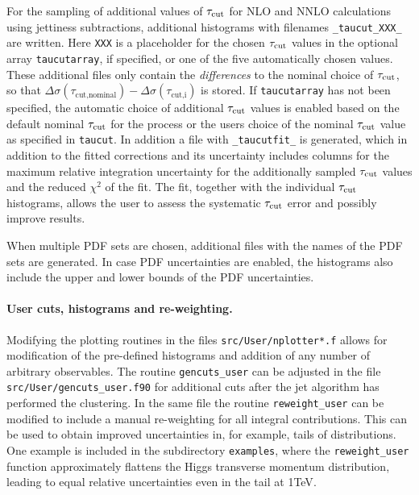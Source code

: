 For the sampling of additional values of $\tau_{\text{cut}}$ for NLO and NNLO calculations using jettiness subtractions, 
additional histograms with filenames \texttt{\_taucut\_XXX\_} are written. Here \texttt{XXX} is a placeholder for the 
chosen $\tau_{\text{cut}}$ values in the optional array \texttt{taucutarray}, if specified, or one of the five automatically 
chosen values. These additional files 
only contain the \emph{differences} to the nominal choice of 
$\tau_{\text{cut}}$, so that $\Delta\sigma(\tau_{\text{cut,nominal}}) - \Delta\sigma(\tau_{\text{cut,i}})$ is stored. If 
\texttt{taucutarray} has not 
been specified, the automatic choice of additional
$\tau_{\text{cut}}$ values is enabled based on the default nominal $\tau_{\text{cut}}$ for the process or the users choice of the nominal 
$\tau_{\text{cut}}$ value as specified in \texttt{taucut}.
In addition a file with \texttt{\_taucutfit\_} is generated, which in addition to the fitted corrections and its 
uncertainty includes columns for the maximum relative integration uncertainty for the additionally sampled $\tau_{\text{cut}}$ 
values and the 
reduced $\chi^2$ of the fit. %
The fit, together with the individual $\tau_{\text{cut}}$ 
histograms, allows the user to assess the systematic $\tau_{\text{cut}}$ error and possibly improve results.

When multiple PDF sets are chosen, additional files with the names of the PDF sets are generated. In case
PDF uncertainties are enabled, the histograms also include the upper and lower bounds of the PDF uncertainties.

\paragraph{User cuts, histograms and re-weighting.}

Modifying the plotting routines in the files \texttt{src/User/nplotter*.f} allows for modification of the pre-defined 
histograms and addition of any number of arbitrary observables. The routine \texttt{gencuts\_user} can be adjusted  in 
the file
\texttt{src/User/gencuts\_user.f90} for additional cuts after the jet algorithm has performed the 
clustering. In the same file the routine \texttt{reweight\_user} can be modified to include a manual re-weighting
for all integral contributions. This can be used to obtain improved uncertainties in, for example, tails of 
distributions.
One example is included in the subdirectory \texttt{examples}, where the \texttt{reweight\_user} function approximately
flattens the Higgs transverse momentum distribution, leading to equal relative uncertainties even in the tail at 
{1}{TeV}.



